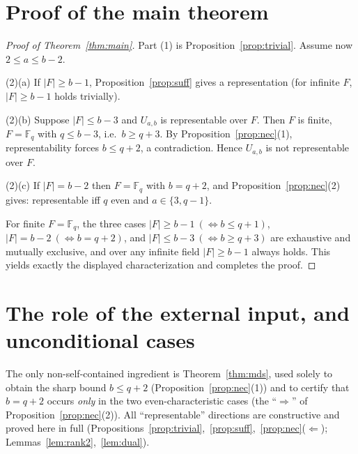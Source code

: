 \documentclass{amsart}
\theoremstyle{definition}
\begin{document}
\section{Proof of the main theorem}

\begin{proof}[Proof of Theorem~\ref{thm:main}]
Part (1) is Proposition~\ref{prop:trivial}. Assume now $2\le a\le b-2$.

(2)(a) If $|F|\ge b-1$, Proposition~\ref{prop:suff} gives a representation (for
infinite $F$, $|F|\ge b-1$ holds trivially).

(2)(b) Suppose $|F|\le b-3$ and $U_{a,b}$ is representable over $F$. Then $F$ is
finite, $F=\mathbb F_q$ with $q\le b-3$, i.e.\ $b\ge q+3$. By
Proposition~\ref{prop:nec}(1), representability forces $b\le q+2$, a
contradiction. Hence $U_{a,b}$ is not representable over $F$.

(2)(c) If $|F|=b-2$ then $F=\mathbb F_q$ with $b=q+2$, and
Proposition~\ref{prop:nec}(2) gives: representable iff $q$ even and
$a\in\{3,q-1\}$.

For finite $F=\mathbb F_q$, the three cases $|F|\ge b-1\ (\!\iff b\le q+1)$,
$|F|=b-2\ (\!\iff b=q+2)$, and $|F|\le b-3\ (\!\iff b\ge q+3)$ are exhaustive and
mutually exclusive, and over any infinite field $|F|\ge b-1$ always holds. This
yields exactly the displayed characterization and completes the proof.
\end{proof}

\section{The role of the external input, and unconditional cases}

The only non-self-contained ingredient is Theorem~\ref{thm:mds}, used solely to
obtain the sharp bound $b\le q+2$ (Proposition~\ref{prop:nec}(1)) and to certify
that $b=q+2$ occurs \emph{only} in the two even-characteristic cases
(the ``$\Rightarrow$'' of Proposition~\ref{prop:nec}(2)). All ``representable''
directions are constructive and proved here in full
(Propositions~\ref{prop:trivial},~\ref{prop:suff},~\ref{prop:nec}($\Leftarrow$);
Lemmas~\ref{lem:rank2},~\ref{lem:dual}).
\end{document}

